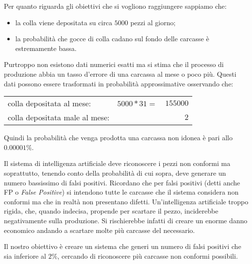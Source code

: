 Per quanto riguarda gli obiettivi che si vogliono raggiungere sappiamo che:
\begin{itemize}
  \item la colla viene depositata su circa $5000$ pezzi al giorno;
  \item la probabilità che gocce di colla cadano sul fondo delle carcasse è estremamente bassa.
\end{itemize}
Purtroppo non esistono dati numerici esatti ma si stima che il processo di produzione abbia un tasso d'errore di una carcassa al mese o poco più.
Questi dati possono essere trasformati in probabilità approssimative osservando che:
\begin{center}
  \begin{tabular}{ l c r }
    colla depositata al mese: & $5000 * 31 =$& $155000$ \\
    colla depositata male al mese: && $2$
  \end{tabular}
\end{center}
Quindi la probabilità che venga prodotta una carcassa non idonea è pari allo $0.00001\%$.

Il sistema di intelligenza artificiale deve riconoscere i pezzi non conformi ma soprattutto, tenendo conto della probabilità di cui sopra, deve generare un numero bassissimo di falsi positivi.
Ricordano che per falsi positivi (detti anche FP o \textit{False Positive}) si intendono tutte le carcasse che il sistema considera non conformi ma che in realtà non presentano difetti.
Un'intelligenza artificiale troppo rigida, che, quando indecisa, propende per scartare il pezzo, inciderebbe negativamente sulla produzione.
Si rischierebbe infatti di creare un enorme danno economico andando a scartare molte più carcasse del necessario.

Il nostro obiettivo è creare un sistema che generi un numero di falsi positivi che sia inferiore al $2\%$, cercando di riconoscere più carcasse non conformi possibili.





